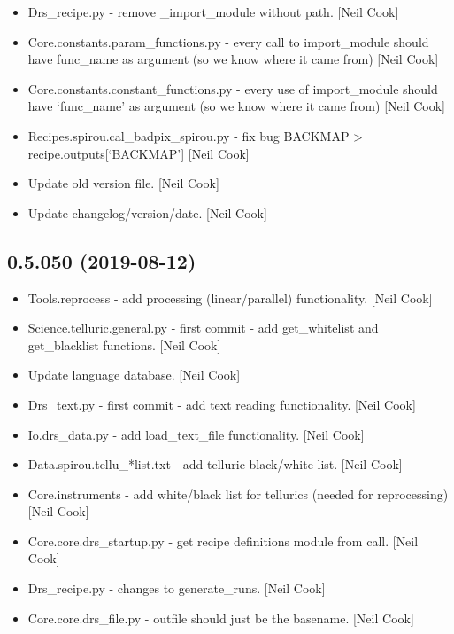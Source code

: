 \documentclass[a4paper,10pt,english]{report}
\begin{document}
\begin{itemize}
\item {} 
Drs\_recipe.py - remove \_import\_module without path. {[}Neil Cook{]}

\item {} 
Core.constants.param\_functions.py - every call to import\_module should
have func\_name as argument (so we know where it came from) {[}Neil Cook{]}

\item {} 
Core.constants.constant\_functions.py - every use of import\_module
should have ‘func\_name’ as argument (so we know where it came from)
{[}Neil Cook{]}

\item {} 
Recipes.spirou.cal\_badpix\_spirou.py - fix bug BACKMAP \textendash{}\textgreater{}
recipe.outputs{[}‘BACKMAP’{]} {[}Neil Cook{]}

\item {} 
Update old version file. {[}Neil Cook{]}

\item {} 
Update changelog/version/date. {[}Neil Cook{]}

\end{itemize}


\subsection{0.5.050 (2019-08-12)}
\label{\detokenize{misc/changelog:id91}}\begin{itemize}
\item {} 
Tools.reprocess - add processing (linear/parallel) functionality.
{[}Neil Cook{]}

\item {} 
Science.telluric.general.py - first commit - add get\_whitelist and
get\_blacklist functions. {[}Neil Cook{]}

\item {} 
Update language database. {[}Neil Cook{]}

\item {} 
Drs\_text.py - first commit - add text reading functionality. {[}Neil
Cook{]}

\item {} 
Io.drs\_data.py - add load\_text\_file functionality. {[}Neil Cook{]}

\item {} 
Data.spirou.tellu\_*list.txt - add telluric black/white list. {[}Neil
Cook{]}

\item {} 
Core.instruments - add white/black list for tellurics (needed for
reprocessing) {[}Neil Cook{]}

\item {} 
Core.core.drs\_startup.py - get recipe definitions module from call.
{[}Neil Cook{]}

\item {} 
Drs\_recipe.py - changes to generate\_runs. {[}Neil Cook{]}

\item {} 
Core.core.drs\_file.py - outfile should just be the basename. {[}Neil
Cook{]}

\end{itemize}
\end{document}
